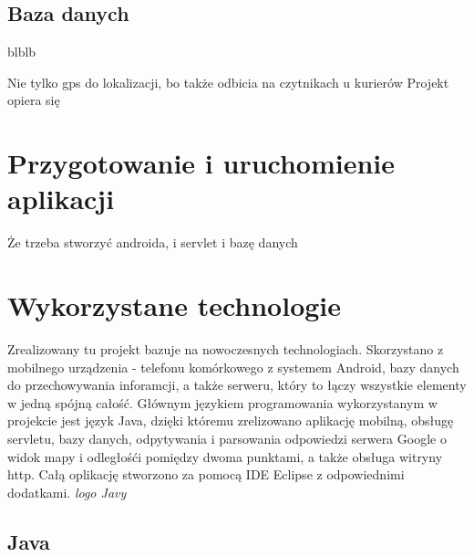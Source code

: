 \documentclass[eng,printmode,oneside]{mgr}
\begin{document}
\section{Baza danych}
blblb


 Nie tylko gps do lokalizacji, bo także odbicia
na czytnikach u kurierów Projekt opiera się 

\chapter{Przygotowanie i uruchomienie aplikacji}

Że trzeba stworzyć androida, i servlet i bazę danych

\chapter{Wykorzystane technologie}

Zrealizowany tu projekt bazuje na nowoczesnych technologiach.
Skorzystano z mobilnego urządzenia - telefonu komórkowego z systemem
Android, bazy danych do przechowywania inforamcji, a także serweru, który to
łączy wszystkie elementy w jedną spójną całość. Głównym językiem
programowania wykorzystanym w projekcie jest język Java, dzięki któremu
zrelizowano aplikację mobilną, obsługę servletu, bazy danych, odpytywania i
parsowania odpowiedzi serwera Google o widok mapy i odległośći pomiędzy dwoma
punktami, a także obsługa witryny http. Całą oplikację stworzono za pomocą IDE
Eclipse z odpowiednimi dodatkami.
\emph{\color{komentarz}logo Javy}

\section{Java}
\end{document}
